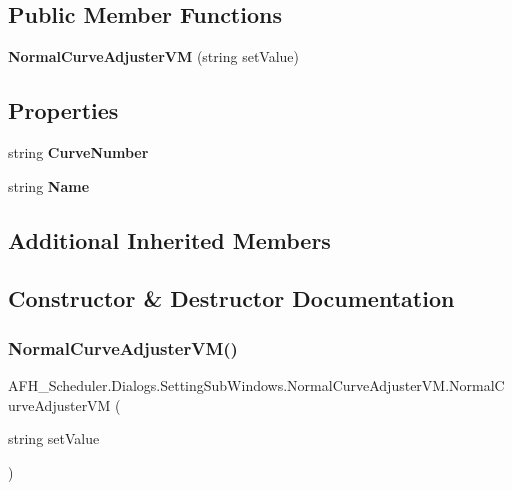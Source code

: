 \subsection*{Public Member Functions}
\begin{DoxyCompactItemize}
\item 
\textbf{ Normal\+Curve\+Adjuster\+VM} (string set\+Value)
\end{DoxyCompactItemize}
\subsection*{Properties}
\begin{DoxyCompactItemize}
\item 
string \textbf{ Curve\+Number}\hspace{0.3cm}{\ttfamily  [get, set]}
\item 
string \textbf{ Name}\hspace{0.3cm}{\ttfamily  [get]}
\end{DoxyCompactItemize}
\subsection*{Additional Inherited Members}


\subsection{Constructor \& Destructor Documentation}
\mbox{\label{class_a_f_h___scheduler_1_1_dialogs_1_1_setting_sub_windows_1_1_normal_curve_adjuster_v_m_a7bf9668f65650a070f0862d52f1f241d}} 
\subsubsection{NormalCurveAdjusterVM()}
{\footnotesize\ttfamily A\+F\+H\+\_\+\+Scheduler.\+Dialogs.\+Setting\+Sub\+Windows.\+Normal\+Curve\+Adjuster\+V\+M.\+Normal\+Curve\+Adjuster\+VM (\begin{DoxyParamCaption}\item[{string}]{set\+Value }\end{DoxyParamCaption})}



